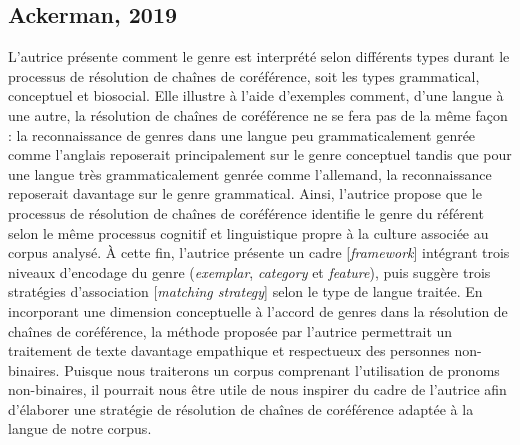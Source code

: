 \documentclass[hidelinks, 11pt, letterpaper]{article}
\begin{document}
\subsection*{Ackerman, 2019}
L'autrice présente comment le genre est interprété selon différents types durant le processus de résolution de chaînes de coréférence, soit les types grammatical, conceptuel et biosocial. Elle illustre à l'aide d'exemples comment, d'une langue à une autre, la résolution de chaînes de coréférence ne se fera pas de la même façon : la reconnaissance de genres dans une langue peu grammaticalement genrée comme l'anglais reposerait principalement sur le genre conceptuel tandis que pour une langue très grammaticalement genrée comme l'allemand, la reconnaissance reposerait davantage sur le genre grammatical. Ainsi, l'autrice propose que le processus de résolution de chaînes de coréférence identifie le genre du référent selon le même processus cognitif et linguistique propre à la culture associée au corpus analysé. À cette fin, l'autrice présente un cadre [\emph{framework}] intégrant trois niveaux d'encodage du genre (\emph{exemplar}, \emph{category} et \emph{feature}), puis suggère trois stratégies d'association [\emph{matching strategy}] selon le type de langue traitée. En incorporant une dimension conceptuelle à l'accord de genres dans la résolution de chaînes de coréférence, la méthode proposée par l'autrice permettrait un traitement de texte davantage empathique et respectueux des personnes non-binaires. Puisque nous traiterons un corpus comprenant l'utilisation de pronoms non-binaires, il pourrait nous être utile de nous inspirer du cadre de l'autrice afin d'élaborer une stratégie de résolution de chaînes de coréférence adaptée à la langue de notre corpus.
\end{document}
